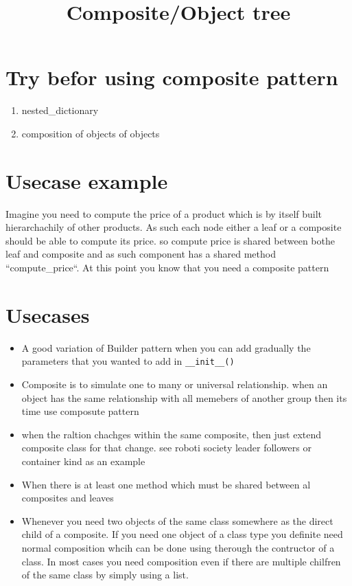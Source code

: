 \documentclass[a4paper]{article}
\title{Composite/Object tree}
\date{}
\begin{document}
    \maketitle
    \section{Try befor using composite pattern}
        \begin{enumerate}
            \item nested\_dictionary
            \item composition of objects of objects
        \end{enumerate}
    \section{Usecase example}
        Imagine you need to compute the price of a product which is by itself built hierarchachily of other products. As such each node either a leaf or a composite should be able to compute its price. so compute price is shared between bothe leaf and composite and as such component has a shared method ``compute\_price``. At this point you know that you need a composite pattern
        
        
    \section{Usecases}
        \begin{itemize}
            \item A good variation of Builder pattern when you can add gradually the parameters that you wanted to add in \verb|__init__()|
            \item Composite is to simulate one to many or universal relationship. when an object has the same relationship with all memebers of another group then its time use composute pattern
            \item when the raltion chachges within the same composite, then just extend composite class for that change. see roboti society leader followers or container kind as an example
            \item When there is at least one method which must be shared between al composites and leaves
            \item Whenever you need two objects of the same class somewhere as the direct child of a composite. If you need one object of a class type you definite need normal composition whcih can be done using therough the contructor of a class. In most cases you need composition even if there are multiple chilfren of the same class by simply using a list.
        \end{itemize}
\end{document}
